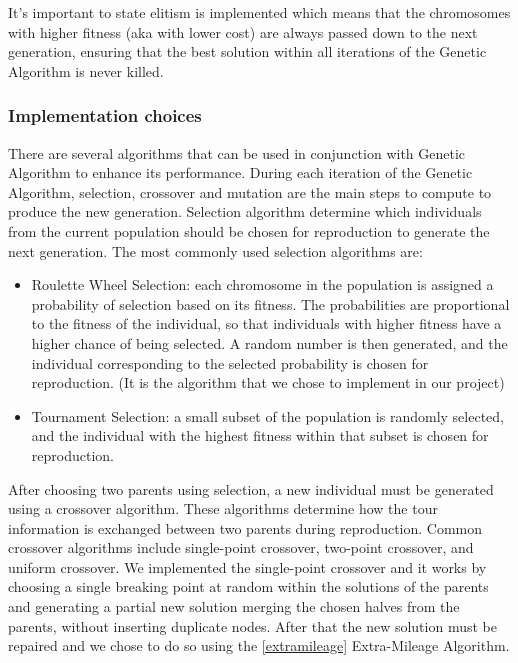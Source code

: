 It's important to state elitism is implemented which means that the chromosomes with higher fitness (aka with lower cost) are always passed down to the next generation, ensuring that the best solution within all iterations of the Genetic Algorithm is never killed. 

\subsubsection{Implementation choices}
There are several algorithms that can be used in conjunction with Genetic Algorithm to enhance its performance.
During each iteration of the Genetic Algorithm, selection, crossover and mutation are the main steps to compute to produce the new generation.
Selection algorithm determine which individuals from the current population should be chosen for reproduction to generate the next generation. The most commonly used selection algorithms are:

\begin{itemize}
    \item Roulette Wheel Selection: each chromosome in the population is assigned a probability of selection based on its fitness. The probabilities are proportional to the fitness of the individual, so that individuals with higher fitness have a higher chance of being selected. A random number is then generated, and the individual corresponding to the selected probability is chosen for reproduction. (It is the algorithm that we chose to implement in our project)
    \item Tournament Selection: a small subset of the population is randomly selected, and the individual with the highest fitness within that subset is chosen for reproduction.
\end{itemize}

After choosing two parents using selection, a new individual must be generated using a crossover algorithm. 
These algorithms determine how the tour information is exchanged between two parents during reproduction. Common crossover algorithms include single-point crossover, two-point crossover, and uniform crossover.
We implemented the single-point crossover and it works by choosing a single breaking point at random within the solutions of the parents and generating a partial new solution merging the chosen halves from the parents, without inserting duplicate nodes.
After that the new solution must be repaired and we chose to do so using the \ref{extramileage} Extra-Mileage Algorithm.

